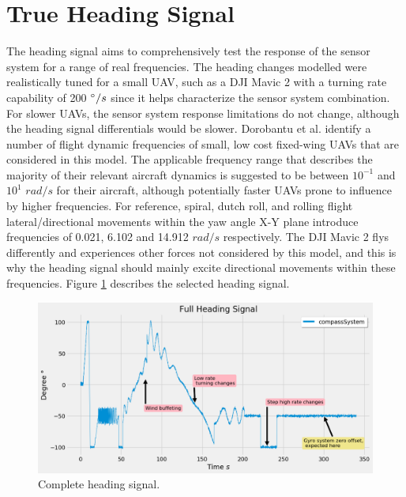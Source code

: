 \section{True Heading Signal}

The heading signal aims to comprehensively test the response of the sensor system for a range of real frequencies. The heading changes modelled were realistically tuned for a small UAV, such as a DJI Mavic 2 \cite{mavic2} with a turning rate capability of 200 $\degree/s$ since it helps characterize the sensor system combination. For slower UAVs, the sensor system response limitations do not change, although the heading signal differentials would be slower. Dorobantu et al. \cite{dorobantu2011frequency} identify a number of flight dynamic frequencies of small, low cost fixed-wing UAVs that are considered in this model. The applicable frequency range that describes the majority of their relevant aircraft dynamics is suggested to be between $10^{-1}$ and $10^1$ $rad/s$ for their aircraft, although potentially faster UAVs prone to influence by higher frequencies. For reference, spiral, dutch roll, and rolling flight lateral/directional movements within the yaw angle X-Y plane introduce frequencies of 0.021, 6.102 and 14.912 $rad/s$ respectively. The DJI Mavic 2 flys differently and experiences other forces not considered by this model, and this is why the heading signal should mainly excite directional movements within these frequencies. Figure \ref{fig:raw_heading_signal} describes the selected heading signal. 

\begin{figure}[h]
    \centering
    \includegraphics[width=\linewidth]{img/fullHeadingSignal.png}
    \caption{Complete heading signal.}
    \label{fig:raw_heading_signal}
\end{figure}

